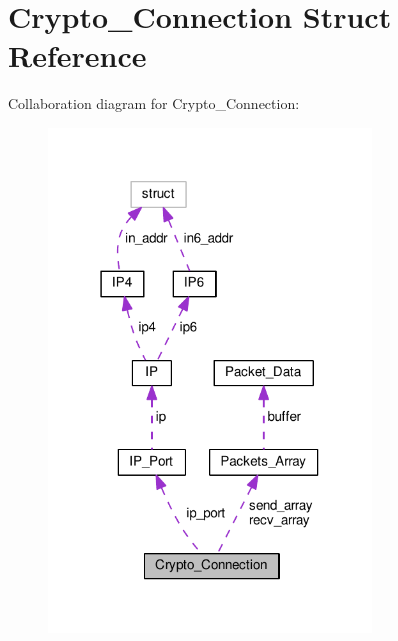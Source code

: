 \hypertarget{struct_crypto___connection}{\section{Crypto\+\_\+\+Connection Struct Reference}
\label{struct_crypto___connection}
}


Collaboration diagram for Crypto\+\_\+\+Connection\+:\nopagebreak
\begin{figure}[H]
\begin{center}
\leavevmode
\includegraphics[width=243pt]{struct_crypto___connection__coll__graph}
\end{center}
\end{figure}

